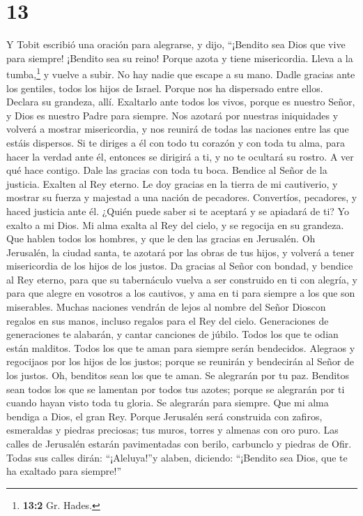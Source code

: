 \hypertarget{section-12}{%
\section{13}\label{section-12}}

 Y Tobit escribió una oración para alegrarse, y dijo,
``¡Bendito sea Dios que vive para siempre! ¡Bendito sea su reino!
 Porque azota y tiene misericordia. Lleva a la
tumba,\footnote{\textbf{13:2} Gr. Hades.} y vuelve a subir. No hay nadie
que escape a su mano.  Dadle gracias ante los gentiles,
todos los hijos de Israel. Porque nos ha dispersado entre ellos.
 Declara su grandeza, allí. Exaltarlo ante todos los
vivos, porque es nuestro Señor, y Dios es nuestro Padre para siempre.
 Nos azotará por nuestras iniquidades y volverá a mostrar
misericordia, y nos reunirá de todas las naciones entre las que estáis
dispersos.  Si te diriges a él con todo tu corazón y con
toda tu alma, para hacer la verdad ante él, entonces se dirigirá a ti, y
no te ocultará su rostro. A ver qué hace contigo. Dale las gracias con
toda tu boca. Bendice al Señor de la justicia. Exalten al Rey eterno. Le
doy gracias en la tierra de mi cautiverio, y mostrar su fuerza y
majestad a una nación de pecadores. Convertíos, pecadores, y haced
justicia ante él. ¿Quién puede saber si te aceptará y se apiadará de ti?
 Yo exalto a mi Dios. Mi alma exalta al Rey del cielo, y
se regocija en su grandeza.  Que hablen todos los hombres,
y que le den las gracias en Jerusalén.  Oh Jerusalén, la
ciudad santa, te azotará por las obras de tus hijos, y volverá a tener
misericordia de los hijos de los justos.  Da gracias al
Señor con bondad, y bendice al Rey eterno, para que su tabernáculo
vuelva a ser construido en ti con alegría, y para que alegre en vosotros
a los cautivos, y ama en ti para siempre a los que son miserables.
 Muchas naciones vendrán de lejos al nombre del Señor
Dioscon regalos en sus manos, incluso regalos para el Rey del cielo.
Generaciones de generaciones te alabarán, y cantar canciones de júbilo.
 Todos los que te odian están malditos. Todos los que te
aman para siempre serán bendecidos.  Alegraos y
regocijaos por los hijos de los justos; porque se reunirán y bendecirán
al Señor de los justos.  Oh, benditos sean los que te
aman. Se alegrarán por tu paz. Benditos sean todos los que se lamentan
por todos tus azotes; porque se alegrarán por ti cuando hayan visto toda
tu gloria. Se alegrarán para siempre.  Que mi alma
bendiga a Dios, el gran Rey.  Porque Jerusalén será
construida con zafiros, esmeraldas y piedras preciosas; tus muros,
torres y almenas con oro puro.  Las calles de Jerusalén
estarán pavimentadas con berilo, carbunclo y piedras de Ofir.
 Todas sus calles dirán: ``¡Aleluya!''y alaben, diciendo:
``¡Bendito sea Dios, que te ha exaltado para siempre!''

